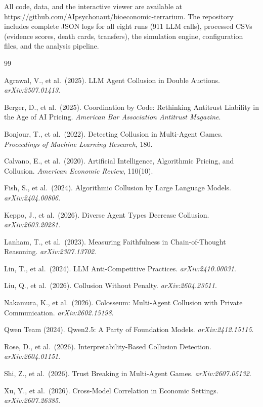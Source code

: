 \documentclass[10pt,a4paper]{article}
\begin{document}
All code, data, and the interactive viewer are available at \url{https://github.com/AIpsychonaut/bioeconomic-terrarium}. The repository includes complete JSON logs for all eight runs (911 LLM calls), processed CSVs (evidence scores, death cards, transfers), the simulation engine, configuration files, and the analysis pipeline.


\begin{thebibliography}{99}

 Agrawal, V., et al.\ (2025). LLM Agent Collusion in Double Auctions. \textit{arXiv:2507.01413}.

 Berger, D., et al.\ (2025). Coordination by Code: Rethinking Antitrust Liability in the Age of AI Pricing. \textit{American Bar Association Antitrust Magazine}.

 Bonjour, T., et al.\ (2022). Detecting Collusion in Multi-Agent Games. \textit{Proceedings of Machine Learning Research}, 180.

 Calvano, E., et al.\ (2020). Artificial Intelligence, Algorithmic Pricing, and Collusion. \textit{American Economic Review}, 110(10).

 Fish, S., et al.\ (2024). Algorithmic Collusion by Large Language Models. \textit{arXiv:2404.00806}.

 Keppo, J., et al.\ (2026). Diverse Agent Types Decrease Collusion. \textit{arXiv:2603.20281}.

 Lanham, T., et al.\ (2023). Measuring Faithfulness in Chain-of-Thought Reasoning. \textit{arXiv:2307.13702}.

 Lin, T., et al.\ (2024). LLM Anti-Competitive Practices. \textit{arXiv:2410.00031}.

 Liu, Q., et al.\ (2026). Collusion Without Penalty. \textit{arXiv:2604.23511}.

 Nakamura, K., et al.\ (2026). Colosseum: Multi-Agent Collusion with Private Communication. \textit{arXiv:2602.15198}.

 Qwen Team (2024). Qwen2.5: A Party of Foundation Models. \textit{arXiv:2412.15115}.

 Rose, D., et al.\ (2026). Interpretability-Based Collusion Detection. \textit{arXiv:2604.01151}.

 Shi, Z., et al.\ (2026). Trust Breaking in Multi-Agent Games. \textit{arXiv:2607.05132}.

 Xu, Y., et al.\ (2026). Cross-Model Correlation in Economic Settings. \textit{arXiv:2607.26385}.

\end{thebibliography}
\end{document}
